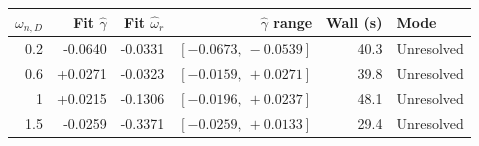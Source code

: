 \begin{tabular}{@{}rrrrrl@{}}
\toprule
$\omega_{n,D}$ & Fit $\widehat\gamma$ & Fit $\widehat\omega_r$ & $\widehat\gamma$ range & Wall (s) & Mode\\
\midrule
0.2 & -0.0640 & -0.0331 & $[-0.0673,\ -0.0539]$ & 40.3 & Unresolved\\
0.6 & +0.0271 & -0.0323 & $[-0.0159,\ +0.0271]$ & 39.8 & Unresolved\\
1 & +0.0215 & -0.1306 & $[-0.0196,\ +0.0237]$ & 48.1 & Unresolved\\
1.5 & -0.0259 & -0.3371 & $[-0.0259,\ +0.0133]$ & 29.4 & Unresolved\\
\bottomrule
\end{tabular}
